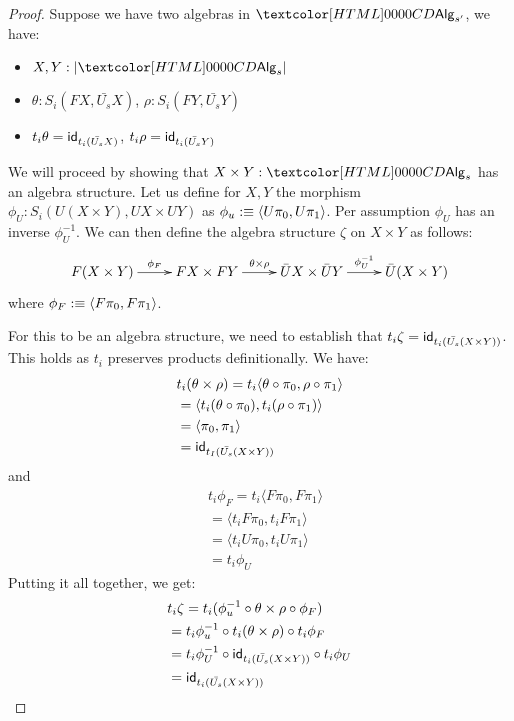 \begin{proof}
  Suppose we have two algebras in $\Alg_{s'}$, \ie we have:
  \begin{itemize}
  \item $X, Y : | \Alg_s |$
  \item $\theta : S_i(FX,\bar{U_s}X)$, $\rho : S_i(FY,\bar{U_s}Y)$
  \item $t_i \theta = \id_{t_i (\bar{U_s} X)}$, $t_i \rho = \id_{t_i (\bar{U_s} Y)}$
  \end{itemize}

  We will proceed by showing that $X \times Y : \Alg_s$ has an algebra
  structure. Let us define for $X, Y$ the morphism
  $\phi_U : S_i(U(X \times Y), UX \times UY)$ as
  $\phi_u :\equiv \langle U \pi_0 , U \pi_1 \rangle$. Per assumption
  $\phi_U$ has an inverse $\phi_U^{-1}$. We can then define the
  algebra structure $\zeta$ on $X \times Y$ as follows:
  $$
  \xymatrix{ 
    F(X \times Y) \ar[r]^{\phi_F}
    &FX \times FY \ar[r]^{\theta \times \rho} 
    &\bar{U}X \times \bar{U}Y \ar[r]^{\phi_U^{-1}} 
    &\bar{U}(X \times Y) 
  }
  $$
  where $\phi_F :\equiv \langle F \pi_0 , F \pi_1 \rangle$.
  
  For this to be an algebra structure, we need to establish that
  $t_i \zeta = \id_{t_i (\bar{U_s} (X \times Y))}$. This holds as
  $t_i$ preserves products definitionally. We have:
  \begin{align*}
    &t_i (\theta \times \rho) = t_i \langle \theta \circ \pi_0 , \rho \circ \pi_1 \rangle \\
    &=  \langle t_i (\theta \circ \pi_0) , t_i (\rho \circ \pi_1) \rangle \\
    &= \langle \pi_0 , \pi_1 \rangle \\
    &= \id_{t_I (\bar{U_s} (X \times Y))}
  \end{align*}
  and
  \begin{align*}
    &t_i \phi_F = t_i \langle F \pi_0 , F \pi_1 \rangle \\
    &= \langle t_i F \pi_0 , t_i F \pi_1 \rangle \\
    &= \langle t_i U \pi_0 , t_i U \pi_1 \rangle \\
    &= t_i \phi_U
  \end{align*}
  Putting it all together, we get:
  \begin{align*}
    &t_i \zeta = t_i (\phi_u^{-1} \circ \theta \times \rho \circ \phi_F) \\
    &= t_i \phi_u^{-1} \circ t_i (\theta \times \rho) \circ t_i \phi_F \\
    &= t_i \phi_U^{-1} \circ \id_{t_i (\bar{U_s} (X \times Y))} \circ t_i \phi_U \\
    &= \id_{t_i (\bar{U_s} (X \times Y))}
  \end{align*}


\end{proof}

